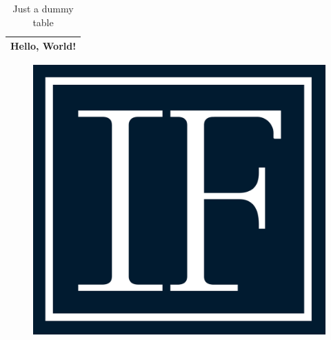 \documentclass[12pt, a4paper]{book}
\begin{document}
\listoftables
\listoffigures

\begin{table}[h!]\center
\caption{Just a dummy table}
\begin{tabular}{|l|}
	\hline Hello, World! \\ \hline
\end{tabular}
\end{table}

\begin{figure}[h!]
	\includegraphics[scale=0.2]{IF_logo.png}
\end{figure}
\end{document}
